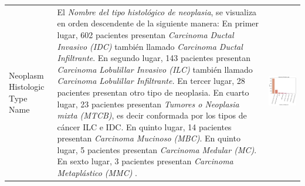 \begin{table}[!htb]
	\footnotesize
	\begin{threeparttable}
		\begin{tabular}{p{2.5cm} p{7cm} p{6.5cm}} \toprule
			
			Neoplasm Histologic Type Name
			& El \textit{Nombre del tipo histológico de neoplasia}, se visualiza en orden descendente de la siguiente manera: En primer lugar, 602 pacientes presentan \textit{Carcinoma Ductal Invasivo (IDC)} también llamado \textit{Carcinoma Ductal Infiltrante}. En segundo lugar, 143 pacientes presentan \textit{Carcinoma Lobulillar Invasivo (ILC)} también llamado \textit{Carcinoma Lobulillar Infiltrante.} En tercer lugar, 28 pacientes presentan otro tipo de neoplasia. En cuarto lugar, 23 pacientes presentan \textit{Tumores o Neoplasia mixta (MTCB)}, es decir conformada por los tipos de cáncer ILC e IDC. En quinto lugar, 14 pacientes presentan \textit{Carcinoma Mucinoso (MBC)}. En quinto lugar, 5 pacientes presentan \textit{Carcinoma Medular (MC)}. En sexto lugar, 3 pacientes presentan \textit{Carcinoma Metaplástico (MMC)}
			.
			& \begin{center}\includegraphics[width=1\linewidth]{NOTEBOOK/IMAGENES_DESCRIPTIVAS/18_neoplasm_histologic_type}\end{center}

\end{tabular}
\end{threeparttable}
\end{table}
